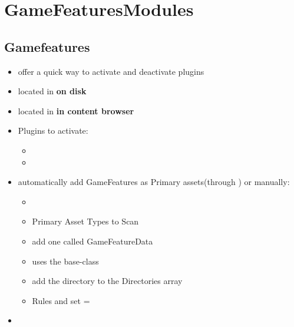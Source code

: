\chapter{GameFeaturesModules}
    \section{Gamefeatures}
        \begin{itemize}
            \item offer a quick way to activate and deactivate plugins
            \item located in  \textbf{on disk}
            \item located in  \textbf{in content browser}
            \item Plugins to activate:
            \begin{itemize}
                \item {}
                \item {}
            \end{itemize}
            \item automatically add GameFeatures as Primary assets(through ) or manually:
            \begin{itemize}
                \item {}
                \item Primary Asset Types to Scan
                \item add one called GameFeatureData
                \item uses the  base-class
                \item add the directory  to the Directories array
                \item Rules and set  = 
            \end{itemize}
            \item 
        \end{itemize}
        
